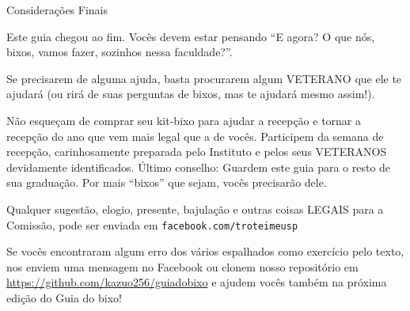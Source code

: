 \begin{secao}{Considerações Finais}

Este guia chegou ao fim. Vocês devem estar pensando ``E agora? O que nós, bixos,
vamos fazer, sozinhos nessa faculdade?''.

Se precisarem de alguma ajuda, basta procurarem algum VETERANO que ele te
ajudará (ou rirá de suas perguntas de bixos, mas te ajudará mesmo assim!).

Não esqueçam de comprar seu kit-bixo para ajudar a recepção e tornar a recepção
do ano que vem mais legal que a de vocês. Participem da semana de recepção,
carinhosamente preparada pelo Instituto e pelos seus VETERANOS devidamente
identificados. Último conselho: Guardem este guia para o resto de sua graduação.
Por mais ``bixos'' que sejam, vocês precisarão dele.

Qualquer sugestão, elogio, presente, bajulação e outras coisas LEGAIS para a
Comissão, pode ser enviada em {\tt facebook.com/troteimeusp}

Se vocês encontraram algum erro dos vários espalhados como exercício pelo texto,
nos enviem uma mensagem no Facebook ou clonem nosso repositório em
\url{https://github.com/kazuo256/guiadobixo} e ajudem vocês também na próxima
edição do Guia do bixo!

\end{secao}
